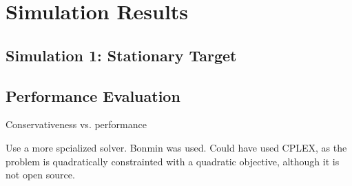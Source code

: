 \section{Simulation Results}\label{sec:simulation-results}


\subsection{Simulation 1: Stationary Target}
\label{sec:simulation-1-stationary-target}

\subsection{Performance Evaluation}
\label{sec:performance-evaluation}

Conservativeness vs. performance

Use a more spcialized solver. Bonmin was used. Could have used CPLEX, as the problem is quadratically constrainted with a quadratic objective, although it is not open source.